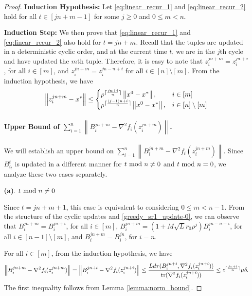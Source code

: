 \documentclass[letterpaper]{article} %
\theoremstyle{plain}
\theoremstyle{definition}
\theoremstyle{remark}
\DeclarePairedDelimiter\ceil{\lceil}{\rceil}
\newcommand\norm[1]{\left\lVert#1\right\rVert}
\begin{document}
\begin{proof}
    \textbf{Induction Hypothesis:} Let \eqref{eq:linear_recur_1} and \eqref{eq:linear_recur_2} hold for all $t \in [jn + m - 1]$ for some $j \geq 0$ and $0 \leq m < n$.
    
    \textbf{Induction Step:} We then prove that \eqref{eq:linear_recur_1} and \eqref{eq:linear_recur_2} also hold for $t = jn + m$. Recall that the tuples are updated in a deterministic cyclic order, and at the current time $t$, we are in the $j$th cycle and have updated the $m$th tuple. Therefore, it is easy to note that $z_i^{j n + m} = z_i^{j n + i}$, for all $i \in [m]$, and $z_{i}^{j n + m} = z_i^{j n - n + i}$ for all $i \in [n] \setminus [m]$. From the induction hypothesis, we have
    \begin{equation*}
        \norm{z_i^{j n + m} - x^*} \leq 
        \begin{cases}
            \rho^{\ceil{\frac{j n + i}{n}}} \norm{x^0 - x^*}, & i\in[m] \\
            \rho^{\ceil{\frac{(j - 1) n + i}{n}}} \norm{x^0 - x^*}, & i\in[n] \setminus [m]
        \end{cases}
    \end{equation*}

    \paragraph{Upper Bound of $\sum_{i=1}^n \norm{B_i^{j n + m} - \nabla^2 f_i(z_i^{j n + m})}$.}
    We will establish an upper bound on $\sum_{i=1}^n \norm{B_i^{j n + m} - \nabla^2 f_i(z_i^{j n + m})}$. 
    Since $B_{i_t}^t$ is updated in a different manner for $t~{\rm mod}~n \neq 0$ and $t~{\rm mod}~n = 0$, we analyze these two cases separately.

    \textbf{(a)}. $t~{\rm mod}~n \neq 0$

    Since $t = j n + m + 1$, this case is equivalent to considering $0 \leq m < n - 1$. From the structure of the cyclic updates and \eqref{greedy_sr1_update-0}, we can observe that $B_i^{j n + m} = B_i^{j n + i}$, for all $i \in [m]$, $B_i^{j n + m} = (1 + M \sqrt{L} r_0 \rho^j) B_i^{j n - n + i}$, for all $i \in [n-1] \setminus [m]$, and $B_i^{jn + m} = B_i^{j n}$, for $i = n$.

    For all $i \in [m]$, from the induction hypothesis, we have
    \begin{equation*}
        \norm{B_i^{j n + m} - \nabla^2 f_i (z_i^{j n + m})} = \norm{B_i^{j n + i} - \nabla^2 f_i (z_i^{j n + i})} \leq \frac{L d \tau(B_i^{j n + i}, \nabla^2 f_i (z_i^{j n + i}))}{\mathrm{tr}(\nabla^2 f_i (z_i^{j n + i}))} \leq c^{\ceil{\frac{j n + i}{n}}}\mu \delta .
    \end{equation*}
    The first inequality follows from Lemma \ref{lemma:norm_bound}. 


\end{proof}
\end{document}
